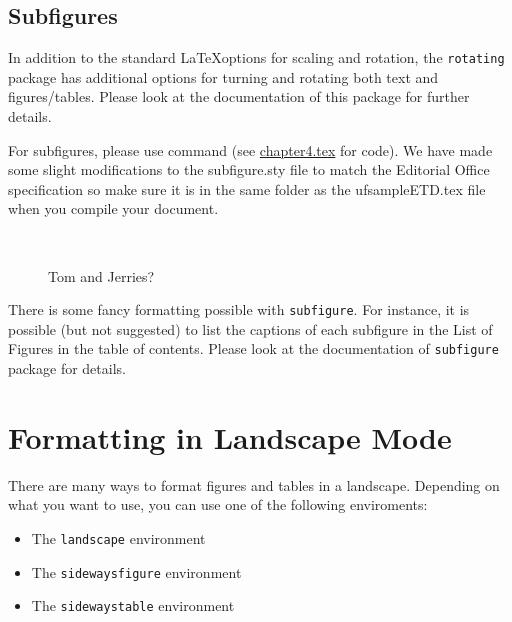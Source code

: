 \subsection{Subfigures}

In addition to the standard \LaTeX options for scaling and rotation, the \texttt{rotating} package has additional options for turning and rotating both text and figures/tables. Please look at the documentation of this package for further details.

For subfigures, please use  command (see \url{chapter4.tex} for code). We have
made some slight modifications to the subfigure.sty file to match the Editorial Office specification so make sure it is in the same folder as the ufsampleETD.tex file when you compile your document.

\begin{figure}[htbp]
  \begin{center}
    \centering
    \mbox{
       \quad
       \quad
     }
    \mbox{
       \quad
       \quad
      }
    \caption[Tom and Jerry]{Tom and Jerries?}
    \label{mice}
  \end{center}
\end{figure}

There is some fancy formatting possible with \texttt{subfigure}. For instance, it is possible (but not suggested) to list the captions of each subfigure in the List of Figures in the table of contents. Please look at the documentation of \texttt{subfigure} package for details.


\section{Formatting in Landscape Mode}\label{landscape}

There are many ways to format figures and tables in a landscape. Depending on what you want to use, you can use one of the following enviroments:

\begin{itemize}
\singlespacing
\item The \texttt{landscape} environment \vspace{-12pt}
\item The \texttt{sidewaysfigure} environment \vspace{-12pt}
\item The \texttt{sidewaystable} environment
\end{itemize}
\doublespacing

